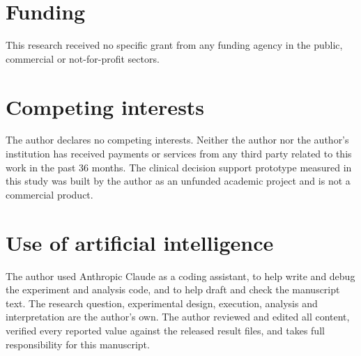 \documentclass[11pt]{article}
\begin{document}
\section*{Funding}

This research received no specific grant from any funding agency in the public, commercial or
not-for-profit sectors.

\section*{Competing interests}

The author declares no competing interests. Neither the author nor the author's institution has
received payments or services from any third party related to this work in the past 36 months.
The clinical decision support prototype measured in this study was built by the author as an
unfunded academic project and is not a commercial product.

\section*{Use of artificial intelligence}

The author used Anthropic Claude as a coding assistant, to help write and debug the experiment
and analysis code, and to help draft and check the manuscript text. The research question,
experimental design, execution, analysis and interpretation are the author's own. The author
reviewed and edited all content, verified every reported value against the released result
files, and takes full responsibility for this manuscript.
\end{document}
